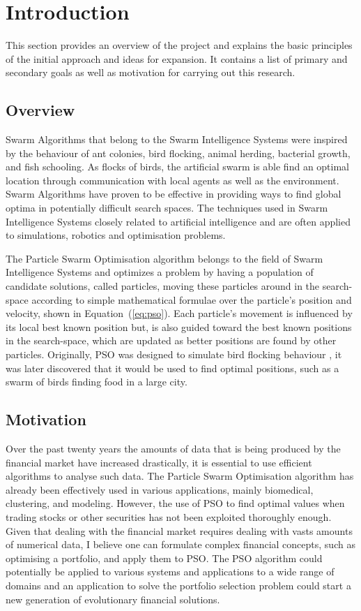 \chapter{Introduction\label{chap:intro}}
This section provides an overview of the project and explains the basic principles of the initial approach and ideas for expansion. It contains a list of primary and secondary goals as well as motivation for carrying out this research.

  \section{Overview} %
  \label{sec:overview}
  Swarm Algorithms that belong to the Swarm Intelligence Systems were inspired by the behaviour of ant colonies, bird flocking, animal herding, bacterial growth, and fish schooling. As flocks of birds, the artificial swarm is able find an optimal location through communication with local agents as well as the environment. Swarm Algorithms have proven to be effective in providing ways to find global optima in potentially difficult search spaces. The techniques used in Swarm Intelligence Systems closely related to artificial intelligence and are often applied to simulations, robotics and optimisation problems. 

  The Particle Swarm Optimisation algorithm belongs to the field of Swarm Intelligence Systems and optimizes a problem by having a population of candidate solutions, called particles, moving these particles around in the search-space according to simple mathematical formulae over the particle's position and velocity, shown in Equation~(\ref{eq:pso}). Each particle's movement is influenced by its local best known position but, is also guided toward the best known positions in the search-space, which are updated as better positions are found by other particles. Originally, PSO was designed to simulate bird flocking behaviour \cite{pso}, it was later discovered that it would be used to find optimal positions, such as a swarm of birds finding food in a large city.

  \section{Motivation} %
  \label{sec:motivation}
  Over the past twenty years the amounts of data that is being produced by the financial market have increased drastically, it is essential to use efficient algorithms to analyse such data. The Particle Swarm Optimisation algorithm has already been effectively used in various applications, mainly  biomedical, clustering, and modeling. However, the use of PSO to find optimal values when trading stocks or other securities has not been exploited thoroughly enough. Given that dealing with the financial market requires dealing with vasts amounts of numerical data, I believe one can formulate complex financial concepts, such as optimising a portfolio, and apply them to PSO. The PSO algorithm could potentially be applied to various systems and applications to a wide range of domains and an application to solve the portfolio selection problem could start a new generation of evolutionary financial solutions. 
  

